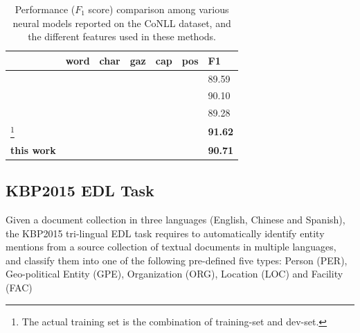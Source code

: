 \documentclass[11pt,a4paper]{article}
\newcommand{\cmark}{\ding{51}}
\newcommand{\xmark}{\ding{55}}
\begin{document}
\begin{table}[h!]
	\centering
	\begin{tabular}{|l|lllll|l|}
		\hline
		& word & char & gaz & cap & pos & F1 \\
		\hline\hline
		\cite{collobert2011natural} & \cmark & \xmark & \cmark & \cmark & \xmark & 89.59  \\
		\cite{huang2015bidirectional} &\cmark & \cmark & \cmark & \cmark & \cmark & 90.10 \\
		\cite{rondeau2016lstm}  & \cmark & \xmark & \cmark & \cmark & \cmark & 89.28 \\
		\cite{chiu2016named} \footnote{The actual training set is the combination of training-set and dev-set.} & \cmark & \cmark & \cmark & \xmark & \xmark & {\bf 91.62} \\
		\hline \hline
		{\bf this work} & \cmark & \cmark & \xmark & \xmark & \xmark & {\bf 90.71} \\
		\hline
	\end{tabular}
	\caption{Performance ($F_1$ score) comparison among various neural models reported on the CoNLL dataset, and the different features used in these methods.}
	\label{tbl:nn-cmp:CoNLL03}
\end{table}


\subsection{KBP2015 EDL Task}

Given a document collection in three languages (English, Chinese and Spanish), the KBP2015 tri-lingual EDL task \cite{kbpoverview2015} requires to automatically identify entity mentions from a
source collection of textual documents in multiple
languages, and classify them into one of the following pre-defined
five types: Person (PER), Geo-political Entity
(GPE), Organization (ORG), Location (LOC)
and Facility (FAC)

\begin{table}
	\caption{Entity Discovery Performance of our method on the KBP2015 EDL evaluation data, with comparison to the best system in KBP2015 official evaluation.}
	\label{Table_KBP2015_ED}
\end{table}
\end{document}
